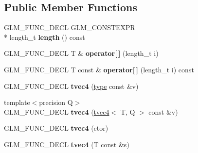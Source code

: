 \subsection*{Public Member Functions}
\begin{DoxyCompactItemize}
\item 
\hypertarget{structglm_1_1detail_1_1tvec4_a1502180449724258f86218d0d9a84d60}{G\-L\-M\-\_\-\-F\-U\-N\-C\-\_\-\-D\-E\-C\-L G\-L\-M\-\_\-\-C\-O\-N\-S\-T\-E\-X\-P\-R \\*
length\-\_\-t {\bfseries length} () const }\label{structglm_1_1detail_1_1tvec4_a1502180449724258f86218d0d9a84d60}

\item 
\hypertarget{structglm_1_1detail_1_1tvec4_ab3acad4916f2eb3d5e5c438f714eefce}{G\-L\-M\-\_\-\-F\-U\-N\-C\-\_\-\-D\-E\-C\-L T \& {\bfseries operator\mbox{[}$\,$\mbox{]}} (length\-\_\-t i)}\label{structglm_1_1detail_1_1tvec4_ab3acad4916f2eb3d5e5c438f714eefce}

\item 
\hypertarget{structglm_1_1detail_1_1tvec4_af44d36ca7826f0906e84d7ba1377759f}{G\-L\-M\-\_\-\-F\-U\-N\-C\-\_\-\-D\-E\-C\-L T const \& {\bfseries operator\mbox{[}$\,$\mbox{]}} (length\-\_\-t i) const }\label{structglm_1_1detail_1_1tvec4_af44d36ca7826f0906e84d7ba1377759f}

\item 
\hypertarget{structglm_1_1detail_1_1tvec4_afcfdeb0b6acbd1e65de7705a0080bed0}{G\-L\-M\-\_\-\-F\-U\-N\-C\-\_\-\-D\-E\-C\-L {\bfseries tvec4} (\hyperlink{structglm_1_1detail_1_1tvec4}{type} const \&v)}\label{structglm_1_1detail_1_1tvec4_afcfdeb0b6acbd1e65de7705a0080bed0}

\item 
\hypertarget{structglm_1_1detail_1_1tvec4_a649d25bc38c98c9c95122a08d4eec842}{{\footnotesize template$<$precision Q$>$ }\\G\-L\-M\-\_\-\-F\-U\-N\-C\-\_\-\-D\-E\-C\-L {\bfseries tvec4} (\hyperlink{structglm_1_1detail_1_1tvec4}{tvec4}$<$ T, Q $>$ const \&v)}\label{structglm_1_1detail_1_1tvec4_a649d25bc38c98c9c95122a08d4eec842}

\item 
\hypertarget{structglm_1_1detail_1_1tvec4_a76288c36dfc019fc431f373a0deb120a}{G\-L\-M\-\_\-\-F\-U\-N\-C\-\_\-\-D\-E\-C\-L {\bfseries tvec4} (ctor)}\label{structglm_1_1detail_1_1tvec4_a76288c36dfc019fc431f373a0deb120a}

\item 
\hypertarget{structglm_1_1detail_1_1tvec4_af4c65b47ca8e04cb84fc7daf5f30d7ad}{G\-L\-M\-\_\-\-F\-U\-N\-C\-\_\-\-D\-E\-C\-L {\bfseries tvec4} (T const \&s)}\label{structglm_1_1detail_1_1tvec4_af4c65b47ca8e04cb84fc7daf5f30d7ad}


\end{DoxyCompactItemize}

